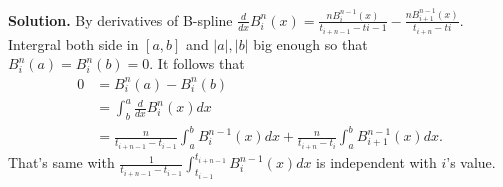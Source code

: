 \documentclass[a4paper]{book}
\newenvironment{solution}%
{\noindent\textbf{Solution.}}%
{\qedhere}
\newcommand\tbbint{{-\mkern-16mu\int}}
\newcommand\dbbint{{-\mkern-20mu\int}}
\newcommand\bbint{
  {\mathchoice{\dbbint}{\tbbint}{\tbbint}{\tbbint}}
}
\numberwithin{equation}{chapter}
\theoremstyle{definition}
\begin{document}
\begin{solution}
  By derivatives of B-spline $\frac{d}{dx} B^n_i(x) = \frac{n B^{n-1}_i(x)}{t_{i+n-1} - t{i-1}} - \frac{n B^{n-1}_{i+1}(x)}{t_{i+n} - t{i}}$. Intergral both side in $[a,b]$ and $\left| a \right|,\left| b \right|$ big enough so that $B^n_i(a) = B^n_i(b) = 0$. It follows that
  \begin{align*}
    0 &= B^n_i(a) - B^n_i(b) \\
      &= \int_{b}^{a} \frac{d}{dx} B^n_i(x)dx\\
      &= \frac{n}{t_{i+n-1} - t_{i-1}} \int_{a}^{b} B^{n-1}_i(x)dx + \frac{n}{t_{i+n} - t_{i}} \int_{a}^{b} B^{n-1}_{i+1}(x)dx .
  \end{align*}
  That's same with $ \frac{1}{t_{i+n-1} - t_{i-1}} \int_{t_{i-1}}^{t_{i+n-1}} B^{n-1}_i(x)dx$ is independent with $i$'s value.
\end{solution}
\end{document}
